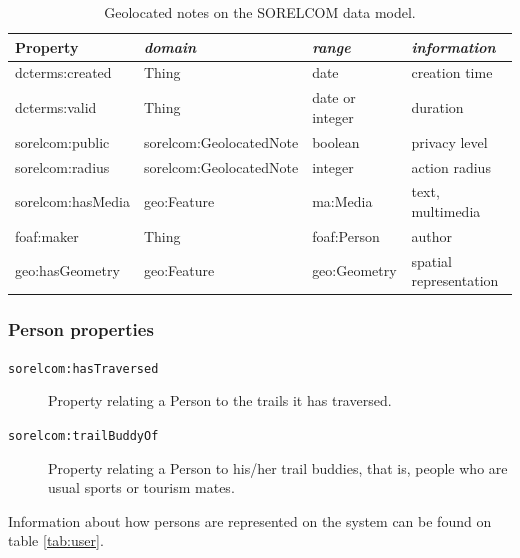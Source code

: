 \begin{table}[ht]
  \centering
  \caption{Geolocated notes on the SORELCOM data model.}\label{tab:note}
  \begin{tabular}{llll}
    \toprule
      \textbf{Property} & \emph{domain}  & \emph{range} & \emph{information}\\
    \midrule
      dcterms:created & Thing & date & creation time \\
      dcterms:valid & Thing & date or integer & duration \\
      sorelcom:public & sorelcom:GeolocatedNote & boolean & privacy level \\
      sorelcom:radius & sorelcom:GeolocatedNote & integer & action radius \\
      sorelcom:hasMedia & geo:Feature & ma:Media & text, multimedia \\
      foaf:maker & Thing & foaf:Person & author \\
      geo:hasGeometry & geo:Feature & geo:Geometry & spatial representation \\
    \bottomrule
  \end{tabular}
\end{table}

\subsubsection*{Person properties}

\begin{description}
\item[\texttt{sorelcom:hasTraversed}] Property relating a Person to the trails it has traversed.
\item[\texttt{sorelcom:trailBuddyOf}] Property relating a Person to his/her trail buddies, that is, people who are usual sports or tourism mates.
\end{description}

Information about how persons are represented on the system can be found on table \ref{tab:user}.

